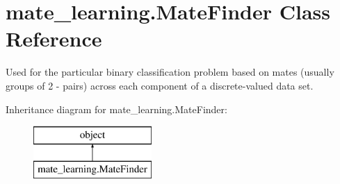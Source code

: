 \hypertarget{classmate__learning_1_1_mate_finder}{\section{mate\+\_\+learning.\+Mate\+Finder Class Reference}
\label{classmate__learning_1_1_mate_finder}
}


Used for the particular binary classification problem based on mates (usually groups of 2 -\/ pairs) across each component of a discrete-\/valued data set.  


Inheritance diagram for mate\+\_\+learning.\+Mate\+Finder\+:\begin{figure}[H]
\begin{center}
\leavevmode
\includegraphics[height=2.000000cm]{classmate__learning_1_1_mate_finder}
\end{center}
\end{figure}
